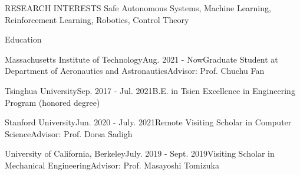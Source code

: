 \documentclass{resume} %
\begin{document}
	\begin{rSection}{RESEARCH INTERESTS}
		Safe Autonomous Systems, Machine Learning, Reinforcement Learning, Robotics, Control Theory
	\end{rSection}

	\begin{rSection}{Education} 		
		\begin{rSubsection2}{Massachusetts Institute of Technology}{Aug. 2021 - Now}{Graduate Student at Department of Aeronautics and Astronautics}{Advisor: Prof. Chuchu Fan}
		\end{rSubsection2} 
	
		\begin{rSubsection2}{Tsinghua University}{Sep. 2017 - Jul. 2021}{B.E. in Tsien Excellence in Engineering Program (honored degree)}{\\} 
		\end{rSubsection2}
		\vspace{-10pt}
        
        \begin{rSubsection2}{Stanford University}{Jun. 2020 - July. 2021}{Remote Visiting Scholar in Computer Science}{Advisor: Prof. Dorsa Sadigh}
		\end{rSubsection2}

		\begin{rSubsection2}{University of California, Berkeley}{July. 2019 - Sept. 2019}{Visiting Scholar in Mechanical Engineering}{Advisor: Prof. Masayoshi Tomizuka}
		\end{rSubsection2}
	\end{rSection}
\end{document}
